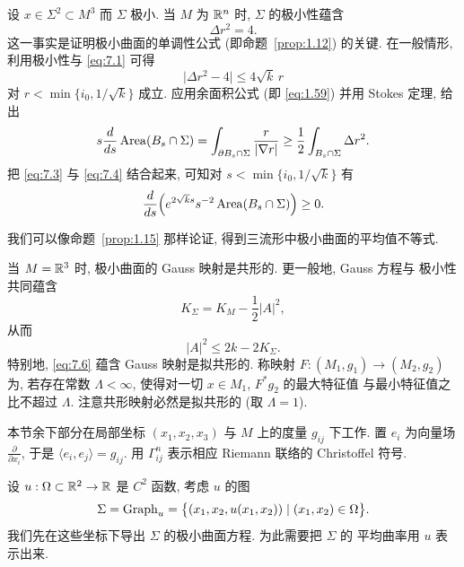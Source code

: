 设 $x\in\Sigma^2\subset M^3$ 而 $\Sigma$ 极小. 当 $M$ 为 $\mathbb{R}^n$ 时,
$\Sigma$ 的极小性蕴含
\begin{equation}
\Delta r^2=4.
\label{eq:7.2}
\end{equation}
这一事实是证明极小曲面的单调性公式 (即命题~\ref{prop:1.12}) 的关键. 在一般情形,
利用极小性与 \eqref{eq:7.1} 可得
\begin{equation}
\bigl|\Delta r^2-4\bigr|\leq4\sqrt{k}\,r
\label{eq:7.3}
\end{equation}
对 $r<\min\{i_0,1/\sqrt{k}\}$ 成立. 应用余面积公式 (即 \eqref{eq:1.59}) 并用
Stokes 定理, 给出
\begin{equation}
s\frac{d}{ds}\operatorname{Area}(B_s\cap\Sigma)
=\int_{\partial B_s\cap\Sigma}\frac{r}{|\nabla r|}
\geq\frac12\int_{B_s\cap\Sigma}\Delta r^2.
\label{eq:7.4}
\end{equation}
把 \eqref{eq:7.3} 与 \eqref{eq:7.4} 结合起来, 可知对
$s<\min\{i_0,1/\sqrt{k}\}$ 有
\begin{equation}
\frac{d}{ds}\Bigl(e^{2\sqrt{k}s}s^{-2}\operatorname{Area}(B_s\cap\Sigma)\Bigr)\geq0.
\label{eq:7.5}
\end{equation}

我们可以像命题~\ref{prop:1.15} 那样论证, 得到三流形中极小曲面的平均值不等式.

当 $M=\mathbb{R}^3$ 时, 极小曲面的 Gauss 映射是共形的. 更一般地, Gauss 方程与
极小性共同蕴含
\begin{equation}
K_{\Sigma}=K_M-\frac12|A|^2,
\label{eq:7.6}
\end{equation}
从而
\begin{equation}
|A|^2\leq2k-2K_{\Sigma}.
\label{eq:7.7}
\end{equation}
特别地, \eqref{eq:7.6} 蕴含 Gauss 映射是拟共形的. 称映射
$F:(M_1,g_1)\to(M_2,g_2)$ 为,
若存在常数 $\Lambda<\infty$, 使得对一切 $x\in M_1$, $F^*g_2$ 的最大特征值
与最小特征值之比不超过 $\Lambda$. 注意共形映射必然是拟共形的 (取
$\Lambda=1$).

本节余下部分在局部坐标 $(x_1,x_2,x_3)$ 与 $M$ 上的度量 $g_{ij}$ 下工作.
置 $e_i$ 为向量场 $\frac{\partial}{\partial x_i}$, 于是
$\langle e_i,e_j\rangle=g_{ij}$. 用 $\Gamma_{ij}^n$ 表示相应 Riemann
联络的 Christoffel 符号.

设 $u:\Omega\subset\mathbb{R}^2\to\mathbb{R}$ 是 $C^2$ 函数, 考虑 $u$ 的图
\begin{equation}
\Sigma=\operatorname{Graph}_u
=\bigl\{(x_1,x_2,u(x_1,x_2))\mid(x_1,x_2)\in\Omega\bigr\}.
\label{eq:7.8}
\end{equation}
我们先在这些坐标下导出 $\Sigma$ 的极小曲面方程. 为此需要把 $\Sigma$ 的
平均曲率用 $u$ 表示出来.

